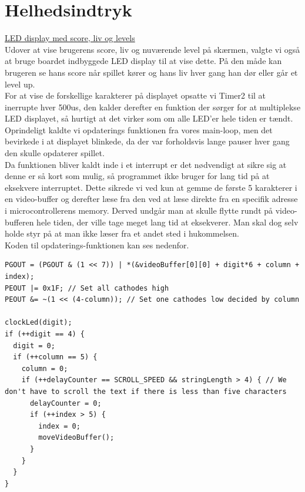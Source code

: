 		

\section{Helhedsindtryk}

\underline{LED display med score, liv og levels}\\

Udover at vise brugerens score, liv og nuværende level på skærmen, valgte vi også at bruge boardet indbyggede LED display til at vise dette. På den måde kan brugeren se hans score når spillet kører og hans liv hver gang han dør eller går et level up. \\
For at vise de forskellige karakterer på displayet opsatte vi Timer2 til at inerrupte hver 500us, den kalder derefter en funktion der sørger for at  multiplekse LED displayet, så hurtigt at det virker som om alle LED'er hele tiden er tændt. Oprindeligt kaldte vi opdaterings funktionen fra vores main-loop, men det bevirkede i at displayet blinkede, da der var forholdsvis lange pauser hver gang den skulle opdaterer spillet. \\

Da funktionen bliver kaldt inde i et interrupt er det nødvendigt at sikre sig at denne er så kort som mulig, så programmet ikke bruger for lang tid på at eksekvere interruptet. Dette sikrede vi ved kun at gemme de første 5 karakterer i en video-buffer og derefter læse fra den ved at læse direkte fra en specifik adresse i microcontrollerens memory. Derved undgår man at skulle flytte rundt på video-bufferen hele tiden, der ville tage meget lang tid at eksekverer. Man skal dog selv holde styr på at man ikke læser fra et andet sted i hukommelsen. \\

Koden til opdaterings-funktionen kan ses nedenfor.

\begin{lstlisting}[frame=single]
PGOUT = (PGOUT & (1 << 7)) | *(&videoBuffer[0][0] + digit*6 + column + index);
PEOUT |= 0x1F; // Set all cathodes high
PEOUT &= ~(1 << (4-column)); // Set one cathodes low decided by column

clockLed(digit);
if (++digit == 4) {
  digit = 0;
  if (++column == 5) {
    column = 0;
	if (++delayCounter == SCROLL_SPEED && stringLength > 4) { // We don't have to scroll the text if there is less than five characters
	  delayCounter = 0;				
	  if (++index > 5) {
        index = 0;
		moveVideoBuffer();
	  }
	}
  }
}
\end{lstlisting}

